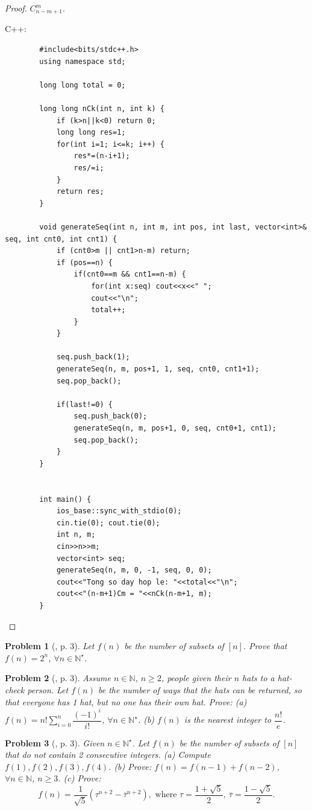 \documentclass[oneside]{book}
\newtheorem{problem}{Problem}
\begin{document}
\begin{proof}
	$C_{n - m + 1}^m$.
	
	C++:
	\begin{verbatim}
		#include<bits/stdc++.h>
		using namespace std;
		
		long long total = 0;
		
		long long nCk(int n, int k) {
			if (k>n||k<0) return 0;
			long long res=1;
			for(int i=1; i<=k; i++) {
				res*=(n-i+1);
				res/=i;
			}
			return res;
		}
		
		void generateSeq(int n, int m, int pos, int last, vector<int>& seq, int cnt0, int cnt1) {
			if (cnt0>m || cnt1>n-m) return;
			if (pos==n) {
				if(cnt0==m && cnt1==n-m) {
					for(int x:seq) cout<<x<<" ";
					cout<<"\n";
					total++;
				}
			}
			
			seq.push_back(1);
			generateSeq(n, m, pos+1, 1, seq, cnt0, cnt1+1);
			seq.pop_back();
			
			if(last!=0) {
				seq.push_back(0);
				generateSeq(n, m, pos+1, 0, seq, cnt0+1, cnt1);
				seq.pop_back();
			}
		}
		
		
		int main() {
			ios_base::sync_with_stdio(0);
			cin.tie(0); cout.tie(0);
			int n, m;
			cin>>n>>m;
			vector<int> seq;
			generateSeq(n, m, 0, -1, seq, 0, 0);
			cout<<"Tong so day hop le: "<<total<<"\n";
			cout<<"(n-m+1)Cm = "<<nCk(n-m+1, m);
		}
	\end{verbatim}
\end{proof}

\begin{problem}[\cite{Shahriari2022}, p. 3]
	Let $f(n)$ be the number of subsets of $[n]$. Prove that $f(n) = 2^n$, $\forall n\in\mathbb{N}^\star$.
\end{problem}

\begin{problem}[\cite{Shahriari2022}, p. 3]
	Assume $n\in\mathbb{N}$, $n\ge2$, people given their $n$ hats to a hat-check person. Let $f(n)$ be the number of ways that the hats can be returned, so that everyone has 1 hat, but no one has their own hat. Prove: (a) $f(n) = n!\sum_{i=0}^n \dfrac{(-1)^i}{i!}$, $\forall n\in\mathbb{N}^\star$. (b) $f(n)$ is the nearest integer to $\dfrac{n!}{e}$.
\end{problem}

\begin{problem}[\cite{Shahriari2022}, p. 3]
	Given $n\in\mathbb{N}^\star$. Let $f(n)$ be the number of subsets of $[n]$ that do not contain 2 consecutive integers. (a) Compute $f(1),f(2),f(3),f(4)$. (b) Prove: $f(n) = f(n - 1) + f(n - 2)$, $\forall n\in\mathbb{N}$, $n\ge3$. (c) Prove:
	\begin{equation*}
		f(n) = \frac{1}{\sqrt{5}}\left(\tau^{n+2} - \overline{\tau}^{n+2}\right),\mbox{ where }\tau = \frac{1 + \sqrt{5}}{2},\ \overline{\tau} = \frac{1 - \sqrt{5}}{2}.
	\end{equation*}
\end{problem}
\end{document}

